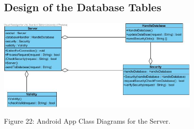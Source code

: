 \documentclass[a4paper]{article}
\begin{document}
\subsection*{Design of the Database Tables}
\includegraphics[width=380px]{Images/APPCDS.jpg}
\begin{center}
Figure 22: Android App Class Diagrams for the Server.
\end{center}
\end{document}
